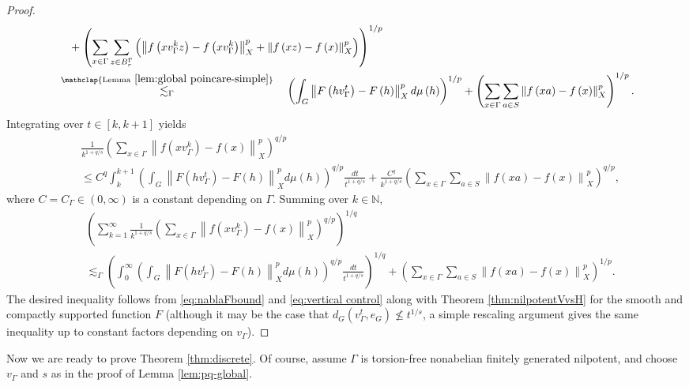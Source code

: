 \documentclass[11pt,reqno]{amsart}
\newcommand{\1}{\mathbf 1}
\begin{document}
\begin{proof}
\begin{align*}
&\quad +\left(\sum_{x\in\Gamma}\sum_{z\in B^\Gamma_r}\left(\left\|f\left(xv_\Gamma^kz\right)-f\left(xv_\Gamma^k\right)\right\|_X^p+\left\|f\left(xz\right)-f\left(x\right)\right\|_X^p\right)\right)^{1/p}\\
&\stackrel{\mathclap{\mathrm{Lemma~}\ref{lem:global poincare-simple}}}{\lesssim_\Gamma} \quad\left(\int_{G}\left\|F\left(hv_\Gamma^t\right)-F\left(h\right)\right\|_X^pd\mu\left(h\right)\right)^{1/p}+\left(\sum_{x\in \Gamma} \sum_{a\in S}\left\|f\left(xa\right)-f\left(x\right)\right\|_X^p\right)^{1/p}.
\end{align*}
Integrating over $t\in \left[k,k+1\right]$ yields
\begin{align*}
&\nonumber\frac{1}{k^{1+q/s}}\left(\sum_{x\in \Gamma}\left\|f\left(xv_\Gamma^k\right)-f\left(x\right)\right\|_X^p\right)^{q/p}\\&\le  C^{q}\int_k^{k+1}\left(\int_{G}\left\|F\left(hv_\Gamma^t\right)-F\left(h\right)\right\|_X^pd\mu\left(h\right)\right)^{q/p}\frac{dt}{t^{1+q/s}} +\frac{C^{q}}{k^{1+q/s}}\left(\sum_{x\in \Gamma} \sum_{a\in S}\left\|f\left(xa\right)-f\left(x\right)\right\|_X^p\right)^{q/p},
\end{align*}
where $C=C_\Gamma\in \left(0,\infty\right)$ is a constant depending on $\Gamma$. Summing over $k\in \mathbb{N}$,
\begin{align}\label{eq:vertical control}
&\nonumber\left(\sum_{k=1}^\infty\frac{1}{k^{1+q/s}}\left(\sum_{x\in \Gamma}\left\|f\left(xv_\Gamma^k\right)-f\left(x\right)\right\|_X^p\right)^{q/p}\right)^{1/q}\\&\lesssim_\Gamma \left(\int_0^{\infty}\left(\int_{G}\left\|F\left(hv_\Gamma^t\right)-F\left(h\right)\right\|_X^pd\mu\left(h\right)\right)^{q/p}\frac{dt}{t^{1+q/s}}\right)^{1/q}+
\left(\sum_{x\in \Gamma} \sum_{a\in S}\left\|f\left(xa\right)-f\left(x\right)\right\|_X^p\right)^{1/p}.
\end{align}
The desired inequality follows from \eqref{eq:nablaFbound} and \eqref{eq:vertical control} along with Theorem \ref{thm:nilpotentVvsH} for the smooth and compactly supported function $F$ (although it may be the case that $d_G\left(v_\Gamma^t,e_G\right)\nleq t^{1/s}$, a simple rescaling argument gives the same inequality up to constant factors depending on $v_\Gamma$).
\end{proof}







Now we are ready to prove Theorem \ref{thm:discrete}. Of course, assume $\Gamma$ is torsion-free nonabelian finitely generated nilpotent, and choose $v_\Gamma$ and $s$ as in the proof of Lemma \ref{lem:pq-global}.
\end{document}
